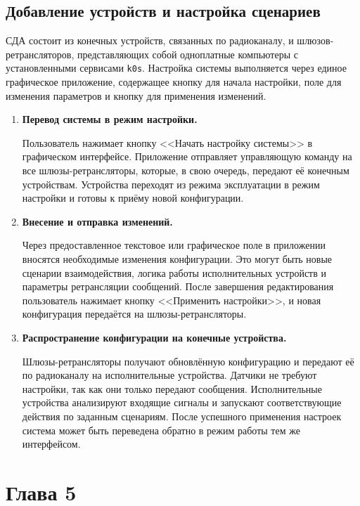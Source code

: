 \documentclass[14pt, a4paper]{extreport}
\begin{document}
\section{Добавление устройств и настройка сценариев}

СДА состоит из конечных устройств, связанных по радиоканалу, и шлюзов-ретрансляторов, представляющих собой одноплатные компьютеры с установленными сервисами \texttt{k0s}. Настройка системы выполняется через единое графическое приложение, содержащее кнопку для начала настройки, поле для изменения параметров и кнопку для применения изменений.

\begin{enumerate}[label=\textbf{\arabic*.}]
    \item \textbf{Перевод системы в режим настройки.} 
    
    Пользователь нажимает кнопку <<Начать настройку системы>> в графическом интерфейсе. Приложение отправляет управляющую команду на все шлюзы-ретрансляторы, которые, в свою очередь, передают её конечным устройствам. Устройства переходят из режима эксплуатации в режим настройки и готовы к приёму новой конфигурации.
    
    \item \textbf{Внесение и отправка изменений.} 
    
    Через предоставленное текстовое или графическое поле в приложении вносятся необходимые изменения конфигурации. Это могут быть новые сценарии взаимодействия, логика работы исполнительных устройств и параметры ретрансляции сообщений. После завершения редактирования пользователь нажимает кнопку <<Применить настройки>>, и новая конфигурация передаётся на шлюзы-ретрансляторы.
    
    \item \textbf{Распространение конфигурации на конечные устройства.} 
    
    Шлюзы-ретрансляторы получают обновлённую конфигурацию и передают её по радиоканалу на исполнительные устройства. Датчики не требуют настройки, так как они только передают сообщения. Исполнительные устройства анализируют входящие сигналы и запускают соответствующие действия по заданным сценариям. После успешного применения настроек система может быть переведена обратно в режим работы тем же интерфейсом.
\end{enumerate}






\newpage

\chapter{Глава 5}
\end{document}
